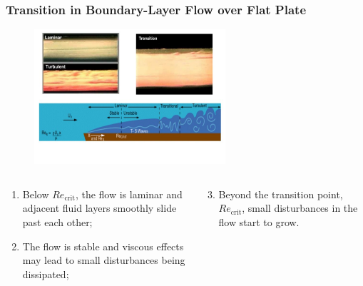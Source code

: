 \documentclass[10pt,compress,handout,ignorenonframetext]{beamer}
\begin{document}
\begin{frame}
 \frametitle{Transition in Boundary-Layer Flow over Flat Plate}
   \begin{figure}%
    \begin{center}
     \includegraphics[width=12.cm, height=5cm, clip]{./Figs/Transition2Turbulence3b}
    \end{center}
   \end{figure}  
  \vspace{-1cm}  
  \begin{columns}
    \begin{column}[l]{0.5\linewidth}
       \begin{enumerate}%
           \item<1-> Below $Re_{\text{crit}}$, the flow is laminar and adjacent fluid layers smoothly slide past each other;
           \item<1-> The flow is stable and viscous effects may lead to small disturbances being dissipated;

       \end{enumerate}
    \end{column}
    \begin{column}[l]{0.5\linewidth}
       \begin{enumerate}\setcounter{enumi}{2}%
           \item<1-> Beyond the transition point, $Re_{\text{crit}}$, small disturbances in the flow start to grow.
       \end{enumerate} 
    \end{column}
  \end{columns}

\end{frame}
\end{document}
